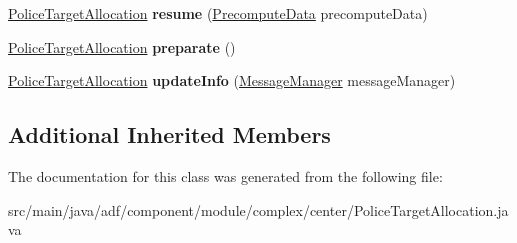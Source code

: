 \begin{DoxyCompactItemize}
\hyperlink{classadf_1_1component_1_1module_1_1complex_1_1center_1_1PoliceTargetAllocation}{Police\+Target\+Allocation} {\bfseries resume} (\hyperlink{classadf_1_1agent_1_1precompute_1_1PrecomputeData}{Precompute\+Data} precompute\+Data)
\item 
\hypertarget{classadf_1_1component_1_1module_1_1complex_1_1center_1_1PoliceTargetAllocation_ac237d20f81ad852deab6fe2c1d65ff69}{}\label{classadf_1_1component_1_1module_1_1complex_1_1center_1_1PoliceTargetAllocation_ac237d20f81ad852deab6fe2c1d65ff69} 
\hyperlink{classadf_1_1component_1_1module_1_1complex_1_1center_1_1PoliceTargetAllocation}{Police\+Target\+Allocation} {\bfseries preparate} ()
\item 
\hypertarget{classadf_1_1component_1_1module_1_1complex_1_1center_1_1PoliceTargetAllocation_a2a543f7458e093a10508c6847e1ee265}{}\label{classadf_1_1component_1_1module_1_1complex_1_1center_1_1PoliceTargetAllocation_a2a543f7458e093a10508c6847e1ee265} 
\hyperlink{classadf_1_1component_1_1module_1_1complex_1_1center_1_1PoliceTargetAllocation}{Police\+Target\+Allocation} {\bfseries update\+Info} (\hyperlink{classadf_1_1agent_1_1communication_1_1MessageManager}{Message\+Manager} message\+Manager)
\end{DoxyCompactItemize}
\subsection*{Additional Inherited Members}


The documentation for this class was generated from the following file\+:\begin{DoxyCompactItemize}
\item 
src/main/java/adf/component/module/complex/center/Police\+Target\+Allocation.\+java\end{DoxyCompactItemize}
